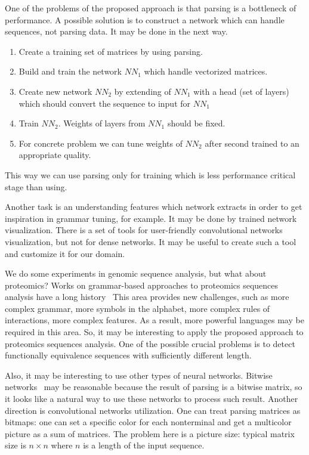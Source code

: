 \documentclass[a4paper,twoside]{article}
\begin{document}
One of the problems of the proposed approach is that parsing is a bottleneck of performance.
A possible solution is to construct a network which can handle sequences, not parsing data.
It may be done in the next way.
\begin{enumerate}
\item Create a training set of matrices by using parsing.
\item Build and train the network $NN_1$ which handle vectorized matrices.
\item Create new network $NN_2$ by extending  of $NN_1$ with a head (set of layers) which should convert the sequence to input for $NN_1$
\item Train $NN_2$. Weights of layers from $NN_1$ should be fixed.
\item For concrete problem we can tune weights of $NN_2$ after second trained to an appropriate quality.
\end{enumerate}
This way we can use parsing only for training which is less performance critical stage than using.

Another task is an understanding features which network extracts in order to get inspiration in grammar tuning, for example.
It may be done by trained network visualization.
There is a set of tools for user-friendly convolutional networks visualization, but not for dense networks.
It may be useful to create such a tool and customize it for our domain.

We do some experiments in genomic sequence analysis, but what about proteomics?
Works on grammar-based approaches to proteomics sequences analysis have a long history~\cite{Jimenez-Montaño1984,Dyrka2008ASC,Sciacca2011AnnotatedSC}%
This area provides new challenges, such as more complex grammar, more symbols in the alphabet, more complex rules of interactions, more complex features.
As a result, more powerful languages may be required in this area.
So, it may be interesting to apply the proposed approach to proteomics sequences analysis.
One of the possible crucial problems is to detect functionally equivalence sequences with sufficiently different length.

Also, it may be interesting to use other types of neural networks.
Bitwise networks~\cite{DBLP:journals:corr:KimS16} may be reasonable because the result of parsing is a bitwise matrix, so it looks like a natural way to use these networks to process such result. 
Another direction is convolutional networks utilization.
One can treat parsing matrices as bitmaps: one can set a specific color for each nonterminal and get a multicolor picture as a sum of matrices.
The problem here is a picture size: typical matrix size is $n \times n$ where $n$ is a length of the input sequence.
\end{document}
